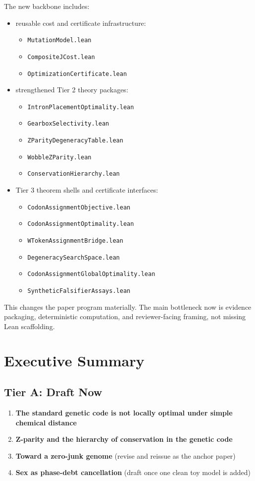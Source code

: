 \documentclass[11pt]{article}
\begin{document}
The new backbone includes:
\begin{itemize}
\item reusable cost and certificate infrastructure:
\begin{itemize}
\item \texttt{MutationModel.lean}
\item \texttt{CompositeJCost.lean}
\item \texttt{OptimizationCertificate.lean}
\end{itemize}
\item strengthened Tier 2 theory packages:
\begin{itemize}
\item \texttt{IntronPlacementOptimality.lean}
\item \texttt{GearboxSelectivity.lean}
\item \texttt{ZParityDegeneracyTable.lean}
\item \texttt{WobbleZParity.lean}
\item \texttt{ConservationHierarchy.lean}
\end{itemize}
\item Tier 3 theorem shells and certificate interfaces:
\begin{itemize}
\item \texttt{CodonAssignmentObjective.lean}
\item \texttt{CodonAssignmentOptimality.lean}
\item \texttt{WTokenAssignmentBridge.lean}
\item \texttt{DegeneracySearchSpace.lean}
\item \texttt{CodonAssignmentGlobalOptimality.lean}
\item \texttt{SyntheticFalsifierAssays.lean}
\end{itemize}
\end{itemize}

This changes the paper program materially. The main bottleneck now is evidence packaging, deterministic computation, and reviewer-facing framing, not missing Lean scaffolding.

\section*{Executive Summary}

\subsection*{Tier A: Draft Now}
\begin{enumerate}
\item \textbf{The standard genetic code is not locally optimal under simple chemical distance}
\item \textbf{Z-parity and the hierarchy of conservation in the genetic code}
\item \textbf{Toward a zero-junk genome} (revise and reissue as the anchor paper)
\item \textbf{Sex as phase-debt cancellation} (draft once one clean toy model is added)
\end{enumerate}
\end{document}

